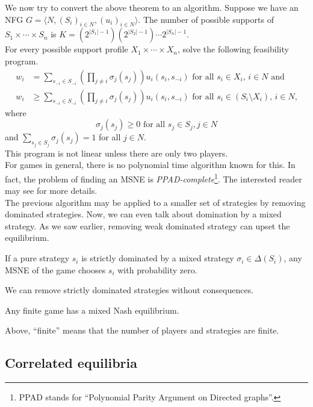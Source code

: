 	We now try to convert the above theorem to an algorithm. Suppose we have an NFG $G = \langle N , (S_i)_{i \in N} , (u_i)_{i \in N} \rangle$. The number of possible supports of $S_1 \times \cdots \times S_n$ is $K = (2^{|S_1|-1})(2^{|S_2|-1})\cdots2^{|S_n|-1}$.\\
	For every possible support profile $X_1 \times \cdots \times X_n$, solve the following feasibility program.
	\begin{align*}
		w_i &= \sum_{s_{-i} \in S_{-i}} \left( \prod_{j \ne i} \sigma_j(s_j) \right) u_i(s_i,s_{-i}) \text{ for all $s_i \in X_i$, $i \in N$ and} \\
		w_i &\ge \sum_{s_{-i} \in S_{-i}} \left( \prod_{j \ne i} \sigma_j(s_j) \right) u_i(s_i,s_{-i}) \text{ for all $s_i \in (S_i \setminus X_i)$, $i \in N$,}
	\end{align*}
	where
	\[ \sigma_j(s_j) \ge 0 \text{ for all $s_j \in S_j,j\in N$} \]
	and $\sum_{s_j \in S_j} \sigma_j(s_j) = 1$ for all $j \in N$.\\
	This program is not linear unless there are only two players.\\
	For games in general, there is no polynomial time algorithm known for this. In fact, the problem of finding an MSNE is \emph{PPAD-complete}\footnote{PPAD stands for ``Polynomial Parity Argument on Directed graphs''.}. The interested reader may see \cite{Daskalakis2009TheCO} for more details.\\

	The previous algorithm may be applied to a smaller set of strategies by removing dominated strategies. Now, we can even talk about domination by a mixed strategy. As we saw earlier, removing weak dominated strategy can upset the equilibrium. 

	\begin{ftheo}
		If a pure strategy $s_i$ is strictly dominated by a mixed strategy $\sigma_i \in \Delta(S_i)$, any MSNE of the game chooses $s_i$ with probability zero.
	\end{ftheo}
	We can remove strictly dominated strategies without consequences.

	\begin{ftheo}
		Any finite game has a mixed Nash equilibrium.
	\end{ftheo}
	Above, ``finite'' means that the number of players and strategies are finite.


\subsection{Correlated equilibria}

